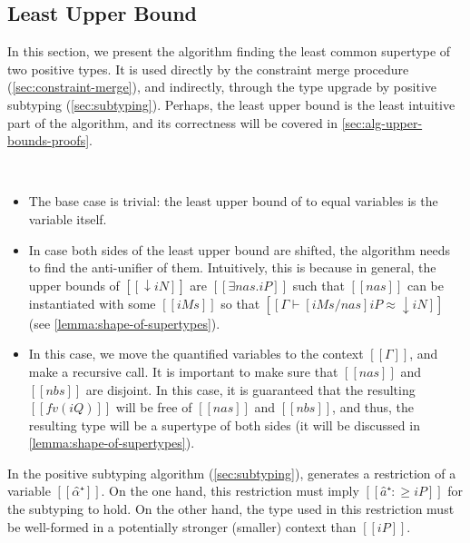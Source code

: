\documentclass[acmsmall,natbib=false,review,anonymous]{acmart}
\begin{document}
\subsection{Least Upper Bound}
\label{sec:lub}

In this section, we present
the algorithm finding the least common supertype of two positive types. 
It is used directly by the constraint merge procedure (\cref{sec:constraint-merge}),
and indirectly, through the type upgrade by positive subtyping
(\cref{sec:subtyping}). Perhaps, the least upper bound is the least 
intuitive part of the algorithm, and its correctness will be covered
in \cref{sec:alg-upper-bounds-proofs}.

\begin{algorithm}
  \hfill\\
  \ottdefnLUBNsub{}
\end{algorithm}

\begin{itemize}
  \item {}
    The base case is trivial: 
    the least upper bound of to equal variables
    is the variable itself.
  \item {}
    In case both sides of the least upper bound are shifted,
    the algorithm needs to find the anti-unifier of them. 
    Intuitively, this is because in general, the upper bounds of
    $[[↓iN]]$ are $[[∃nas.iP]]$ such that 
    $[[nas]]$ can be instantiated with some $[[iMs]]$ so that
    $[[ Γ ⊢ [iMs/nas]iP ≈ ↓iN ]]$ (see \cref{lemma:shape-of-supertypes}).
  \item {}
    In this case, we move the quantified variables to the context $[[Γ]]$, 
    and make a recursive call. 
    It is important to make sure that $[[nas]]$ and $[[nbs]]$ are disjoint.
    In this case, it is guaranteed that the resulting 
    $[[fv(iQ)]]$ will be free of $[[nas]]$ and $[[nbs]]$,
    and thus, the resulting type will be a supertype of both sides
    (it will be discussed in \cref{lemma:shape-of-supertypes}).
\end{itemize}


In the positive subtyping algorithm (\cref{sec:subtyping}),
generates a restriction of a variable $[[α̂⁺]]$.
On the one hand, this restriction must imply 
$[[â⁺ :≥ iP]]$ for the subtyping to hold.
On the other hand, the type used in this restriction 
must be well-formed in a potentially stronger (smaller) 
context than $[[iP]]$.
\end{document}
